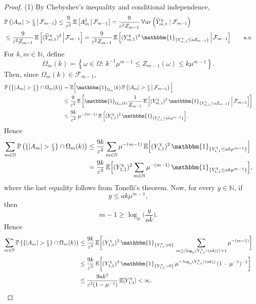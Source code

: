 \documentclass[10pt,a4paper]{amsart}
\newcommand{\EE}{\mathbb E}
\newcommand{\N}{\mathbb N}
\newcommand{\PP}{\mathbb{P}}
\begin{document}
\begin{proof}
\medskip\noindent
(1) By Chebyshev's inequality and conditional independence,
\[
\begin{aligned}
&\PP\left( |A_m|>\tfrac{\varepsilon}{3} \,\middle|\, \mathcal{F}_{m-1} \right)
\leq \frac{9}{\varepsilon^2}\, \EE\left[ A_m^2 \,\middle|\, \mathcal{F}_{m-1} \right]
= \frac{9}{\varepsilon^2 Z_{m-1}}\, \mathbb{V}{\rm ar}\left( \widetilde{Y}_{m,1}^{\chi} \mid \mathcal F_{m-1} \right)\\
&\leq \frac{9}{\varepsilon^2 Z_{m-1}}\, \EE\left[ (\widetilde{Y}_{m,1}^{\chi})^2 \,\middle|\, \mathcal{F}_{m-1} \right]
= \frac{9}{\varepsilon^2 Z_{m-1}}\, \EE\left[(Y_{m,1}^{\chi})^2\, \mathbbm{1}_{\{Y_{m,1}^{\chi}\leq aZ_{m-1}\}} 
\,\middle|\, \mathcal{F}_{m-1} \right] \qquad \mathrm{a.s.}
\end{aligned}
\]
For $k,m\in\N$, define
\[
\Omega_{m}(k) = \left\{\omega\in \Omega\colon\, k^{-1}\mu^{m-1}\leq Z_{m-1}(\omega)\leq k\mu^{m-1} \right\}.
\]
Then, since $\Omega_m(k)\in\mathcal F_{m-1}$,
\[
\begin{aligned}
\PP\left( \left\{|A_m|>\tfrac{\varepsilon}{3}\right\}\cap \Omega_{m}(k) \right)
&
=\EE\Big[ \mathbbm{1}_{\Omega_{m}}(k)\, \PP\left(|A_m|>\tfrac{\varepsilon}{3} \,\middle|\, \mathcal{F}_{m-1} \right) \Big]
\\&
\leq \frac{9}{\varepsilon^2}\, \EE\left[ \mathbbm{1}_{\Omega_m(k)}\frac{1}{Z_{m-1}}\, \EE\left[ (Y_{m,1}^{\chi})^2\, \mathbbm{1}_{\{Y_{m,1}^{\chi}\leq aZ_{m-1}\}}
\,\middle|\, \mathcal{F}_{m-1} \right] \right]
\\&
\leq \frac{9k}{\varepsilon^2}\,\mu^{-(m-1)}\, \EE\left[ (Y_{1,1}^{\chi})^2\, \mathbbm{1}_{\{Y_{1,1}^{\chi}\leq ak\mu^{m-1}\}}
\right].
\end{aligned}
\]
Hence
\[
\begin{aligned}
\sum_{m\in\N} \PP\left( \{|A_m|>\tfrac{\varepsilon}{3}\}\cap\Omega_m(k) \right)
&
\leq \frac{9k}{\varepsilon^2} \sum_{m\in\N} \mu^{-(m-1)}\, \EE\Big[ (Y_{1,1}^{\chi})^2\, \mathbbm{1}_{\{Y_{1,1}^{\chi}\le ak\mu^{m-1}\}} \Big]
\\&
= \frac{9k}{\varepsilon^2}\, \EE\Big[ (Y_{1,1}^{\chi})^2 \sum_{m\in\N} \mu^{-(m-1)}\,\mathbbm{1}_{\{Y_{1,1}^{\chi}\le ak\mu^{m-1}\}} \Big],
\end{aligned}
\]
where the last equality follows from Tonelli's theorem. Now, for every $y\in\N$, if
\[
y\leq ak\mu^{m-1},
\]
then
\[
m-1\geq \log_{\mu}\Big(\frac{y}{ak}\Big).
\]
Hence
\[
\begin{aligned}
\sum_{m\in\N} \PP\left( \{|A_m|>\tfrac{\varepsilon}{3}\}\cap\Omega_m(k) \right)
&
\leq \frac{9k}{\varepsilon^2}\,\EE\bigg[ (Y_{1,1}^{\chi})^2\,\mathbbm{1}_{\{Y_{1,1}^{\chi}>0\}}\, \sum_{m\geq \lceil\log_\mu(Y_{1,1}^{\chi}/(ak))\rceil+1} \mu^{-(m-1)}
\bigg]
\\&
\leq \frac{9k}{\varepsilon^2}\, \EE\bigg[ (Y_{1,1}^{\chi})^2\,\mathbbm{1}_{\{Y_{1,1}^{\chi}>0\}}\,  \mu^{-\log_{\mu}(Y_{1,1}^{\chi}/(ak))}\,(1-\mu^{-1})^{-1} \bigg]
\\&
\leq \frac{9ak^2}{\varepsilon^2(1-\mu^{-1})}\, \EE[Y_{1,1}^{\chi}] <\infty.
\end{aligned}
\]


\end{proof}
\end{document}
